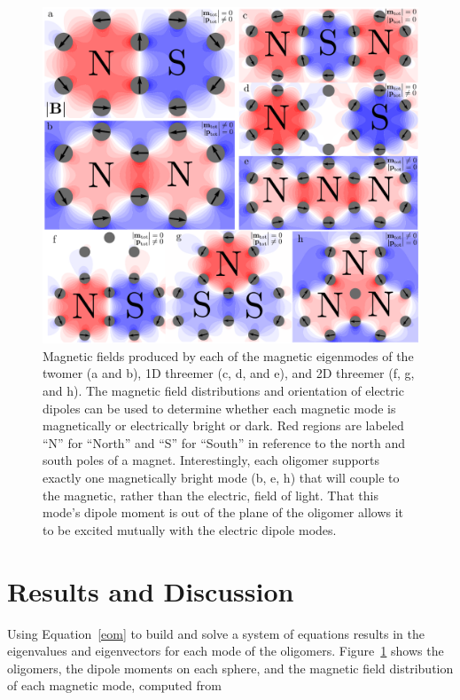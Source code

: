 \documentclass[12pt, letterpaper, twoside]{report}
\begin{document}
\begin{figure}
\centering
\includegraphics[width=6in]{fields_new_arrows.pdf}
\caption{Magnetic fields produced by each of the magnetic eigenmodes of the twomer (a and b), 1D threemer (c, d, and e), and 2D threemer (f, g, and h). The magnetic field distributions and orientation of electric dipoles can be used to determine whether each magnetic mode is magnetically or electrically bright or dark. Red regions are labeled ``N'' for ``North'' and ``S'' for ``South'' in reference to the north and south poles of a magnet. Interestingly, each oligomer supports exactly one magnetically bright mode (b, e, h) that will couple to the magnetic, rather than the electric, field of light. That this mode's dipole moment is out of the plane of the oligomer allows it to be excited mutually with the electric dipole modes.}
\label{field_plots}
\end{figure}

\section*{Results and Discussion}
Using Equation~\ref{eom} to build and solve a system of equations results in the eigenvalues and eigenvectors for each mode of the oligomers. Figure~\ref{field_plots} shows the oligomers, the dipole moments on each sphere, and the magnetic field distribution of each magnetic mode, computed from\cite{jackson_classical_1999}
\end{document}
